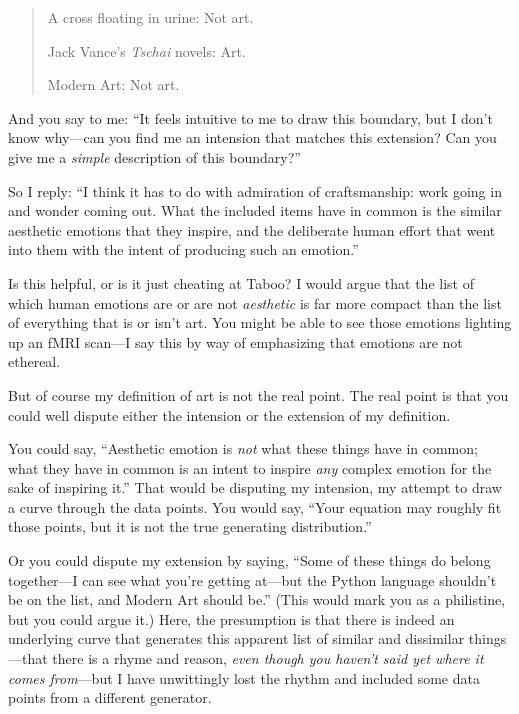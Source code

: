 {\begin{quote}
 A cross floating in urine: Not art.


 Jack Vance's \textit{Tschai} novels: Art.

{
  Modern Art: Not art.}
\end{quote}


 And you say to me: ``It feels intuitive to me to
draw this boundary, but I don't know why---can you find
me an intension that matches this extension? Can you give me a
\textit{simple} description of this boundary?''


 So I reply: ``I think it has to do with
admiration of craftsmanship: work going in and wonder coming out. What
the included items have in common is the similar aesthetic emotions
that they inspire, and the deliberate human effort that went into them
with the intent of producing such an emotion.''


 Is this helpful, or is it just cheating at Taboo? I would argue
that the list of which human emotions are or are not \textit{aesthetic}
is far more compact than the list of everything that is or
isn't art. You might be able to see those emotions
lighting up an fMRI scan---I say this by way of emphasizing that
emotions are not ethereal.


 But of course my definition of art is not the real point. The real
point is that you could well dispute either the intension or the
extension of my definition.


 You could say, ``Aesthetic emotion is
\textit{not} what these things have in common; what they have in common
is an intent to inspire \textit{any} complex emotion for the sake of
inspiring it.'' That would be disputing my intension,
my attempt to draw a curve through the data points. You would say,
``Your equation may roughly fit those points, but it
is not the true generating distribution.''


 Or you could dispute my extension by saying,
``Some of these things do belong together---I can see
 what you're getting at---but the Python language
 shouldn't be on the list, and Modern Art should
be.'' (This would mark you as a philistine, but you
could argue it.) Here, the presumption is that there is indeed an
underlying curve that generates this apparent list of similar and
dissimilar things---that there is a rhyme and reason, \textit{even
though you haven't said yet where it comes
from}{}---but I have unwittingly lost the rhythm and included some data
points from a different generator.

}
